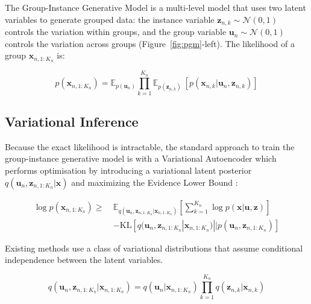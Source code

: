 \documentclass{article} %
\begin{document}
The Group-Instance Generative Model \citep{Bouchacourt2018MultiLevelVA,Hosoya2019GroupbasedLO} is a multi-level model that uses two latent variables to generate grouped data: the instance variable $\mathbf{z}_{n,k} \sim \mathcal{N} (0,1)$ controls the variation within groups, and the group variable $\mathbf{u}_n \sim \mathcal{N} (0, 1)$ controls the variation across groups (Figure~\ref{fig:pgm}-left). The likelihood of a group $\mathbf{x}_{n,1:K_n}$ is:

\begin{equation*}
p(\mathbf{x}_{n, 1:K_n}) = \mathbb{E}_{p(\mathbf{u}_n)}  \prod_{k=1}^{K_n} \mathbb{E}_{p(\mathbf{z}_{n,k})} ~ [p(\mathbf{x}_{n,k} | \mathbf{u}_n, \mathbf{z}_{n,k})]
\end{equation*}

\subsection{Variational Inference}

Because the exact likelihood is intractable, the standard approach to train the group-instance generative model is with a Variational Autoencoder \citep{Kingma2014AutoEncodingVB,JimenezRezende2014StochasticBA} which performs optimisation by introducing a variational latent posterior $q(\mathbf{u}_n, \mathbf{z}_{n, 1:K_n} | \mathbf{x})$ and maximizing the Evidence Lower Bound \citep{Jordan2004AnIT}:

\begin{equation} \begin{aligned}
\log p(\mathbf{x}_{n,1:K_n}) \geq ~ & \mathbb{E}_{q(\mathbf{u}_n, \mathbf{z}_{n, 1:K_n} | \mathbf{x}_{n, 1:K_n} )} \left[\sum_{k=1}^{K_n} \log p(\mathbf{x} | \mathbf{u}, \mathbf{z})\right] \\ &- \mathrm{KL} [q(\mathbf{u}_n, \mathbf{z}_{n, 1:K_n}  | \mathbf{x}_{n, 1:K_n} ) || p(\mathbf{u}_n, \mathbf{z}_{n, 1:K_n} )]
\end{aligned} \end{equation}

Existing methods use a class of variational distributions that assume conditional independence between the latent variables.

\begin{equation*}
q(\mathbf{u}_n, \mathbf{z}_{n, 1:K_n}  | \mathbf{x}_{n, 1:K_n} ) = q(\mathbf{u}_n | \mathbf{x}_{n, 1:K_n} ) \prod_{k=1}^{K_n} q(\mathbf{z}_{n,k} | \mathbf{x}_{n,k})
\end{equation*}
\end{document}
